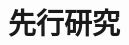 \documentclass[../main]{subfiles}
\begin{document}
\graphicspath{{../figures/chap1/}}

\section{先行研究}
\label{sec:intro_previous-research}
\end{document}
